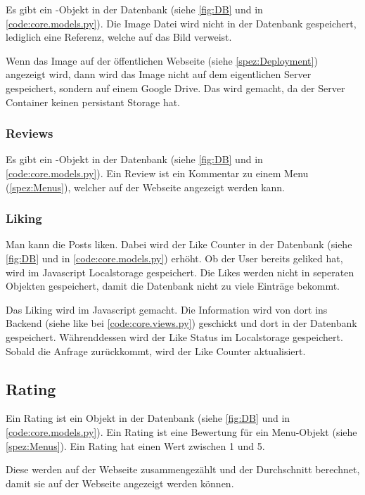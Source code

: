 Es gibt ein -Objekt in der Datenbank (siehe \ref{fig:DB} und in
\ref{code:core.models.py}). Die Image Datei wird nicht in der Datenbank
gespeichert, lediglich eine Referenz, welche auf das Bild verweist.

Wenn das Image auf der öffentlichen Webseite (siehe \ref{spez:Deployment}) angezeigt wird, dann
wird das Image nicht auf dem eigentlichen Server gespeichert, sondern auf einem
Google Drive. Das wird gemacht, da der Server Container keinen persistant
Storage hat.

\subsubsection{Reviews} \label{spez:Reviews}

Es gibt ein -Objekt in der Datenbank (siehe \ref{fig:DB} und in
\ref{code:core.models.py}). Ein Review ist ein Kommentar zu einem Menu
(\ref{spez:Menus}), welcher auf der Webseite angezeigt werden kann.

\subsubsection{Liking} \label{spez:Liking}

Man kann die Posts liken. Dabei wird der Like Counter in der Datenbank (siehe
\ref{fig:DB} und in \ref{code:core.models.py}) erhöht. Ob der User bereits
geliked hat, wird im Javascript Localstorage gespeichert. Die Likes werden nicht
in seperaten Objekten gespeichert, damit die Datenbank nicht zu viele Einträge
bekommt.

Das Liking wird im Javascript gemacht. Die Information wird von dort ins Backend
(siehe like bei \ref{code:core.views.py}) geschickt und dort in der Datenbank
gespeichert. Währenddessen wird der Like Status im Localstorage gespeichert.
Sobald die Anfrage zurückkommt, wird der Like Counter aktualisiert.

\subsection{Rating} \label{spez:Rating}

Ein Rating ist ein Objekt in der Datenbank (siehe \ref{fig:DB} und in
\ref{code:core.models.py}). Ein Rating ist eine Bewertung für ein Menu-Objekt
(siehe \ref{spez:Menus}). Ein Rating hat einen Wert zwischen 1 und 5.

Diese werden auf der Webseite zusammengezählt und der Durchschnitt berechnet,
damit sie auf der Webseite angezeigt werden können.


